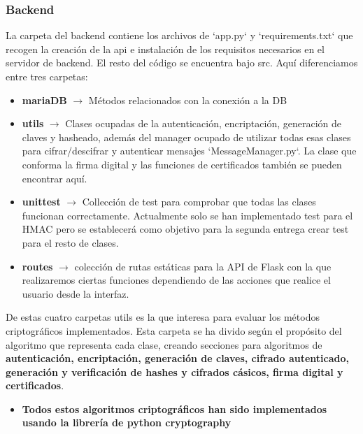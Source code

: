 \documentclass[a4paper,11pt]{article}
\begin{document}
\subsubsection{Backend}
La carpeta del backend contiene los archivos de `app.py` y `requirements.txt` que recogen la creación de la api e instalación de los requisitos necesarios en el servidor de backend. El resto del código se encuentra bajo src. Aquí diferenciamos entre tres carpetas:
\begin{itemize}
\item \textbf{mariaDB} $\rightarrow$ Métodos relacionados con la conexión a la DB

\item \textbf{utils} $\rightarrow$ Clases ocupadas de la autenticación, encriptación, generación de claves y hasheado, además del manager ocupado de utilizar todas esas clases para cifrar/descifrar y autenticar mensajes `MessageManager.py`. La clase que conforma la firma digital y las funciones de certificados también se pueden encontrar aquí.

\item \textbf{unittest} $\rightarrow$ Collección de test para comprobar que
    todas las clases funcionan correctamente. Actualmente solo se han
    implementado test para el HMAC pero se establecerá como objetivo para la
    segunda entrega crear test para el resto de clases.

\item \textbf{routes} $\rightarrow$ colección de rutas estáticas para la API de 
    Flask con la que realizaremos ciertas funciones dependiendo de las acciones que
    realice el usuario desde la interfaz.
    
\end{itemize}

De estas cuatro carpetas utils es la que interesa para evaluar los métodos
criptográficos implementados. Esta carpeta se ha divido según el propósito del
algoritmo que representa cada clase, creando secciones para algoritmos de
\textbf{autenticación, encriptación, generación de claves, cifrado autenticado, generación y verificación de hashes y
cifrados cásicos, firma digital y certificados}. \\

\begin{itemize}
    \item \textbf{Todos estos algoritmos criptográficos han sido implementados usando la librería de python cryptography}
\end{itemize}
\end{document}
